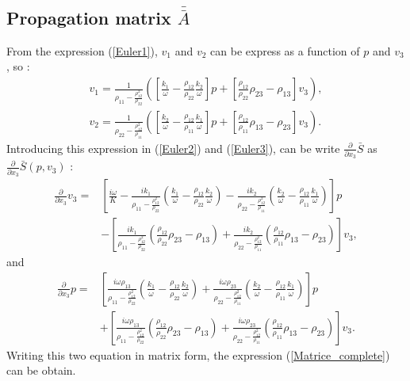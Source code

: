 \documentclass{article}
\begin{document}
\subsection*{Propagation matrix $\bar{\bar{A}}$}
	From the expression (\ref{Euler1}), $v_1$ and $v_2$ can be express as a function of $p$ and $v_3$, so :
\begin{align*}
	v_1=\frac{1}{\rho_{11}-\frac{\rho_{12}^2}{\rho_{22}}}([\frac{k_1}{\omega}-\frac{\rho_{12}}{\rho_{22}}\frac{k_2}{\omega}]p+[\frac{\rho_{12}}{\rho_{22}}\rho_{23}-\rho_{13}]v_3), \\
	v_2=\frac{1}{\rho_{22}-\frac{\rho_{12}^2}{\rho_{11}}}([\frac{k_2}{\omega}-\frac{\rho_{12}}{\rho_{11}}\frac{k_1}{\omega}]p+[\frac{\rho_{12}}{\rho_{11}}\rho_{13}-\rho_{23}]v_3).
\end{align*}
 	Introducing this expression in (\ref{Euler2}) and (\ref{Euler3}), can be write $\frac{\partial}{\partial x_3}\bar{S}$ as $\frac{\partial}{\partial x_3}\bar{S}(p,v_3)$ :
    \begin{align*}
    \frac{\partial}{\partial x_3}v_3=&[\frac{i\omega}{K}-\frac{ik_1}{\rho_{11}-\frac{\rho_{12}^2}{\rho_{22}}}(\frac{k_1}{\omega}-\frac{\rho_{12}}{\rho_{22}}\frac{k_2}{\omega})-\frac{ik_2}{\rho_{22}-\frac{\rho_{12}^2}{\rho_{11}}}(\frac{k_2}{\omega}-\frac{\rho_{12}}{\rho_{11}}\frac{k_1}{\omega})]p\\
    &-[\frac{ik_1}{\rho_{11}-\frac{\rho_{12}^2}{\rho_{22}}}(\frac{\rho_{12}}{\rho_{22}}\rho_{23}-\rho_{13})+\frac{ik_2}{\rho_{22}-\frac{\rho_{12}^2}{\rho_{11}}}(\frac{\rho_{12}}{\rho_{11}}\rho_{13}-\rho_{23})]v_3,
    \end{align*}
    and 
    \begin{align*}
    \frac{\partial}{\partial x_3}p=&[\frac{i\omega \rho_{13}}{\rho_{11}-\frac{\rho_{12}^2}{\rho_{22}}}(\frac{k_1}{\omega}-\frac{\rho_{12}}{\rho_{22}}\frac{k_2}{\omega})+\frac{i\omega \rho_{23}}{\rho_{22}-\frac{\rho_{12}^2}{\rho_{11}}}(\frac{k_2}{\omega}-\frac{\rho_{12}}{\rho_{11}}\frac{k_1}{\omega})]p\\
    &+[\frac{i\omega \rho_{13}}{\rho_{11}-\frac{\rho_{12}^2}{\rho_{22}}}(\frac{\rho_{12}}{\rho_{22}}\rho_{23}-\rho_{13})+\frac{i\omega \rho_{23}}{\rho_{22}-\frac{\rho_{12}^2}{\rho_{11}}}(\frac{\rho_{12}}{\rho_{11}}\rho_{13}-\rho_{23})]v_3.
    \end{align*}
    Writing this two equation in matrix form, the expression (\ref{Matrice_complete}) can be obtain.
    
\end{document}
